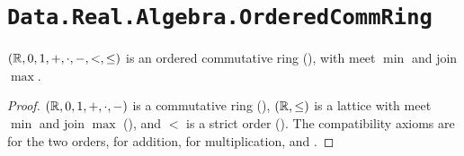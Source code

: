 \section{\texttt{Data.Real.Algebra.OrderedCommRing}}

\begin{theorem}
  \label{ROrderedCommRing}
  $(\mathbb{R}, 0, 1, +, \cdot, -, <, \le)$ is an ordered commutative ring (), with meet $\min$ and join $\max$.
\end{theorem}
\begin{proof}
  $(\mathbb{R}, 0, 1, +, \cdot, -)$ is a commutative ring (), $(\mathbb{R}, \le)$ is a lattice with meet $\min$ and join $\max$ (), and $<$ is a strict order (). The compatibility axioms are  for the two orders,  for addition,  for multiplication, and .
\end{proof}
